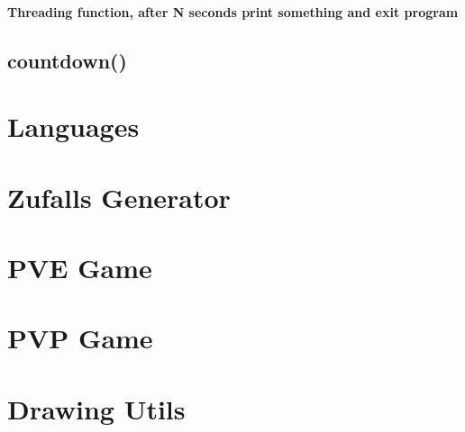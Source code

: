 \documentclass{article}
\begin{document}
\paragraph{Threading function, after N seconds print something and exit program}
\subsection{countdown()}

\section{Languages}
\section{Zufalls Generator}
\section{PVE Game}
\section{PVP Game}
\section{Drawing Utils}
\end{document}

